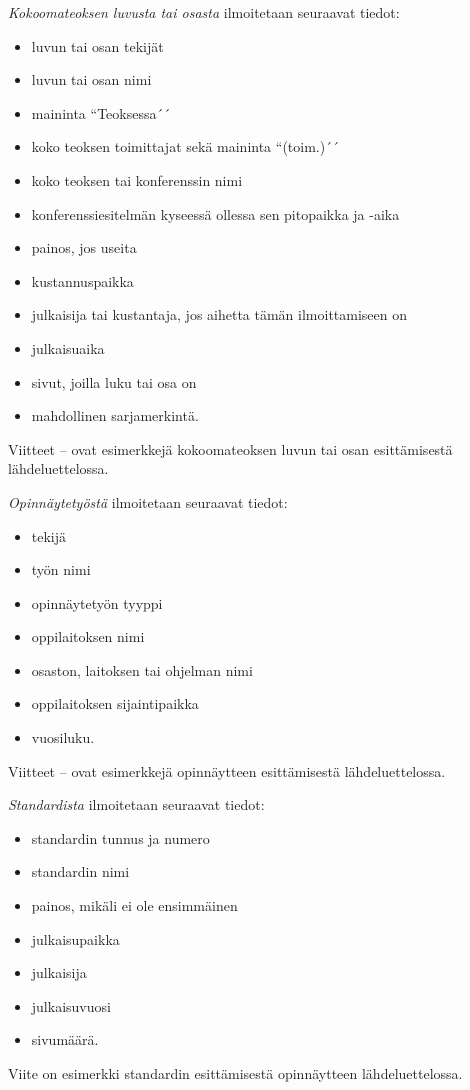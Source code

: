 \documentclass[finnish, 12pt, a4paper, arts, utf8, a-2b, online]{aaltothesis}
\begin{document}
\noindent
\textit{Kokoomateoksen luvusta tai osasta} ilmoitetaan seuraavat tiedot:
\begin{itemize}
	\setlength{\itemsep}{-3pt}
	\item[--]luvun tai osan tekijät
	\item[--]luvun tai osan nimi
	\item[--]maininta ``Teoksessa´´
	\item[--]koko teoksen toimittajat sekä maininta ``(toim.)´´
	\item[--]koko teoksen tai konferenssin nimi
	\item[--]konferenssiesitelmän kyseessä ollessa sen pitopaikka ja -aika
	\item[--]painos, jos useita
	\item[--]kustannuspaikka
	\item[--]julkaisija tai kustantaja, jos aihetta tämän ilmoittamiseen on
	\item[--]julkaisuaika
	\item[--]sivut, joilla luku tai osa on 
	\item[--]mahdollinen sarjamerkintä.
\end{itemize}
Viitteet \cite{Sihvola}--\cite{Lindblom} ovat esimerkkejä kokoomateoksen luvun 
tai osan esittämisestä lähdeluettelossa. 

\noindent
\textit{Opinnäytetyöstä} ilmoitetaan seuraavat tiedot:
\begin{itemize}
	\setlength{\itemsep}{-3pt}
	\item[--]tekijä
	\item[--]työn nimi
	\item[--]opinnäytetyön tyyppi
	\item[--]oppilaitoksen nimi
	\item[--]osaston, laitoksen tai ohjelman nimi
	\item[--]oppilaitoksen sijaintipaikka
	\item[--]vuosiluku.
\end{itemize}
Viitteet \cite{Miinusmaa}--\cite{Lonnqvist} ovat esimerkkejä opinnäytteen 
esittämisestä lähdeluettelossa. 

\noindent
\textit{Standardista} ilmoitetaan seuraavat tiedot:
\begin{itemize}
	\setlength{\itemsep}{-3pt}
	\item[--]standardin tunnus ja numero
	\item[--]standardin nimi
	\item[--]painos, mikäli ei ole ensimmäinen
	\item[--]julkaisupaikka
	\item[--]julkaisija
	\item[--]julkaisuvuosi
	\item[--]sivumäärä.
\end{itemize}
Viite \cite{sfs} on esimerkki standardin esittämisestä opinnäytteen
lähdeluettelossa. 
\end{document}
